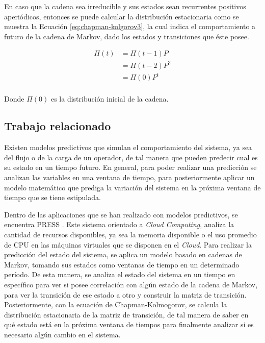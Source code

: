 \normalsize{En caso que la cadena sea irreducible y sus estados sean recurrentes positivos aperi\'odicos}, entonces se puede calcular la distribuci\'on estacionaria como se muestra la Ecuaci\'on \ref{eq:chapman-kolgorov3}, la cual indica el comportamiento a futuro de la cadena de Markov, dado los estados y transiciones que \'este posee.

\begin{equation} \label{eq:chapman-kolgorov3}
\begin{split}
	\Pi (t) &= \Pi (t-1)P \\
				  &= \Pi (t-2)P^{2}\\
				  &= \Pi (0)P^{t}\\
\end{split}
\end{equation}

\normalsize{Donde $\Pi (0)$ es la distribuci\'on inicial de la cadena.}

\subsection{Trabajo relacionado}
\label{subSec:markovTrabajo}
Existen modelos predictivos \normalsize{que} simulan el comportamiento del sistema, ya sea del flujo o de la carga de un operador, de tal manera que pueden predecir cual es su estado en un tiempo futuro. En general, para poder realizar una predicci\'on se analizan las variables en una ventana de tiempo, para posteriormente aplicar un modelo matem\'atico que prediga la variaci\'on del sistema en la pr\'oxima ventana de tiempo que se tiene estipulada.

Dentro de las aplicaciones que se han realizado con modelos predictivos, se encuentra PRESS \citep{GongGW10}. Este sistema orientado a \textit{Cloud Computing}, analiza la cantidad de recursos disponibles, ya sea la memoria disponible o el uso promedio de CPU en las m\'aquinas virtuales que se disponen en el \textit{Cloud}. Para realizar la predicci\'on del estado del sistema, se aplica un modelo basado en cadenas de Markov, tomando sus estados como ventanas de tiempo en un determinado per\'iodo. De esta manera, se analiza el estado del sistema en un tiempo en espec\'ifico para ver si posee correlaci\'on con alg\'un estado de la cadena de Markov, para ver la transici\'on de ese estado a otro y construir la matriz de transici\'on. Posteriormente, con la ecuaci\'on de Chapman-Kolmogorov, se calcula la distribuci\'on estacionaria de la matriz de transici\'on, de tal manera de saber en \normalsize{qu\'e} estado est\'a en la pr\'oxima ventana de tiempos para finalmente analizar si es necesario alg\'un cambio en el sistema.

